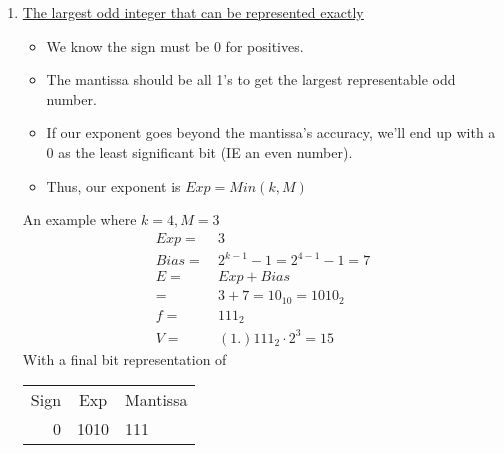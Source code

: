 \documentclass{article}
\begin{document}
\begin{enumerate}[label=\Alph*)]
    \pagebreak

    \item \underline{The largest odd integer that can be represented exactly}
    \begin{itemize}
        \item We know the sign must be 0 for positives.
        \item The mantissa should be all 1's to get the largest representable odd number.
        \item If our exponent goes beyond the mantissa's accuracy, we'll end up with a 0 as the least significant bit (IE an even number).
        \item Thus, our exponent is \(Exp = Min(k, M)\)
    \end{itemize}
    An example where \(k = 4, M = 3\)
    \begin{align*}
        Exp =&\ 3 \\
        Bias =&\ 2^{k-1} - 1 = 2^{4-1} - 1 = 7 \\
        E =&\ Exp + Bias \\
          =&\ 3 + 7 = 10_{10} = 1010_2 \\
        f =&\ 111_2 \\
        V =&\ (1.)111_2 \cdot 2^{3} = 15
    \end{align*}
    With a final bit representation of
    \begin{tabular}{r|c|l}
        Sign & Exp & Mantissa \\
        0 & 1010 & 111 \\
    \end{tabular} \\

\end{enumerate}
\end{document}
